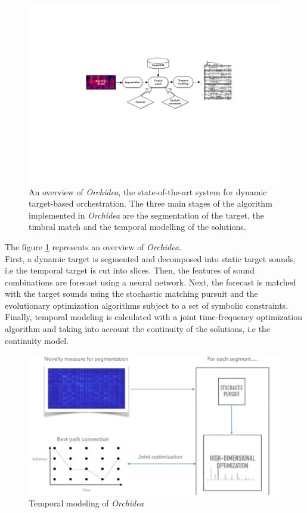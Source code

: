 \documentclass[a4paper]{book}
\begin{document}
\begin{figure}[ht!]
\centering
\includegraphics[scale=0.6]{Orchidea_overview.pdf}
\caption{An overview of \textit{Orchidea}, the state-of-the-art system for dynamic target-based orchestration. The three main stages of the algorithm implemented in \textit{Orchidea} are the segmentation of the target, the timbral match and the temporal modelling of the solutions.}
\label{fig:orchidea_overview}
\end{figure}

The figure \ref{fig:orchidea_overview} represents an overview of \textit{Orchidea}.\\
First, a dynamic target is segmented and decomposed into static target sounds, i.e the temporal target is cut into slices. Then, the features of sound combinations are forecast using a neural network. Next, the forecast is matched with the target sounds using the stochastic matching pursuit and the evolutionary optimization algorithms subject to a set of symbolic constraints. Finally, temporal modeling is calculated with a joint time-frequency optimization algorithm and taking into account the continuity of the solutions, i.e the continuity model. \\

\begin{figure}[ht!]
    \centering
    \includegraphics[scale=0.3]{tempmodel.png}
    \caption{Temporal modeling of \textit{Orchidea}}
    \label{fig:tempmodel}
\end{figure}
\end{document}
